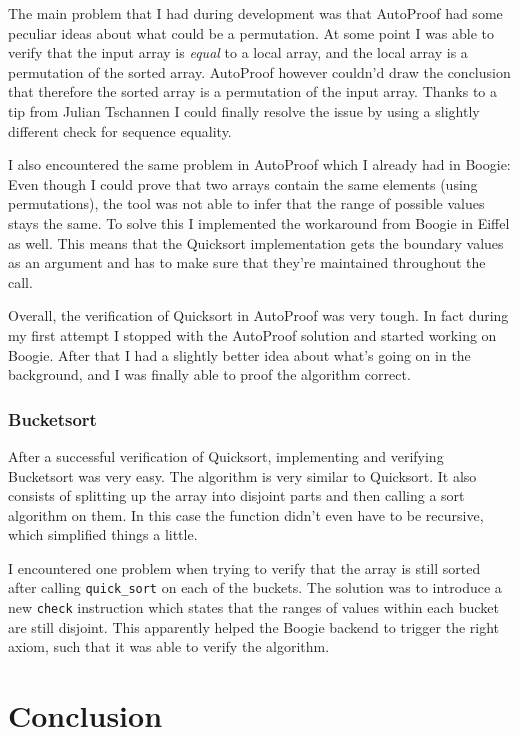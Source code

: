 \documentclass[a4paper,10pt]{article}
\begin{document}
The main problem that I had during development was that AutoProof had some peculiar ideas about what could be a permutation.
At some point I was able to verify that the input array is \emph{equal} to a local array, and the local array is a permutation of the sorted array.
AutoProof however couldn'd draw the conclusion that therefore the sorted array is a permutation of the input array.
Thanks to a tip from Julian Tschannen I could finally resolve the issue by using a slightly different check for sequence equality.

I also encountered the same problem in AutoProof which I already had in Boogie:
Even though I could prove that two arrays contain the same elements (using permutations), the tool was not able to infer that the range of possible values stays the same.
To solve this I implemented the workaround from Boogie in Eiffel as well.
This means that the Quicksort implementation gets the boundary values as an argument and has to make sure that they're maintained throughout the call.

Overall, the verification of Quicksort in AutoProof was very tough.
In fact during my first attempt I stopped with the AutoProof solution and started working on Boogie.
After that I had a slightly better idea about what's going on in the background, and I was finally able to proof the algorithm correct.

\subsubsection{Bucketsort}

After a successful verification of Quicksort, implementing and verifying Bucketsort was very easy.
The algorithm is very similar to Quicksort.
It also consists of splitting up the array into disjoint parts and then calling a sort algorithm on them.
In this case the function didn't even have to be recursive, which simplified things a little.

I encountered one problem when trying to verify that the array is still sorted after calling \lstinline!quick_sort! on each of the buckets.
The solution was to introduce a new \lstinline!check! instruction which states that the ranges of values within each bucket are still disjoint.
This apparently helped the Boogie backend to trigger the right axiom, such that it was able to verify the algorithm.

\section {Conclusion}
\end{document}
